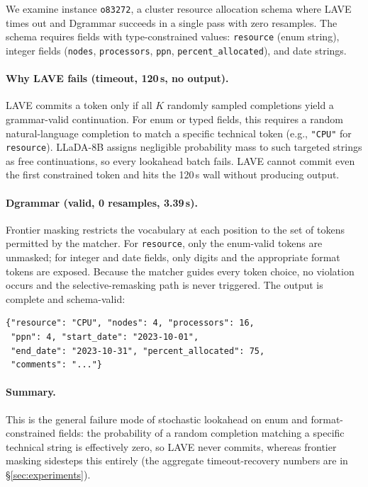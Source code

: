\documentclass[11pt]{article}
\begin{document}
We examine instance \texttt{o83272}, a cluster resource allocation schema where LAVE times out and Dgrammar succeeds in a single pass with zero resamples. The schema requires fields with type-constrained values: \texttt{resource} (enum string), integer fields (\texttt{nodes}, \texttt{processors}, \texttt{ppn}, \texttt{percent\_allocated}), and date strings.

\paragraph{Why LAVE fails (timeout, 120\,s, no output).} LAVE commits a token only if all $K$ randomly sampled completions yield a grammar-valid continuation. For enum or typed fields, this requires a random natural-language completion to match a specific technical token (e.g., \texttt{"CPU"} for \texttt{resource}). LLaDA-8B assigns negligible probability mass to such targeted strings as free continuations, so every lookahead batch fails. LAVE cannot commit even the first constrained token and hits the 120\,s wall without producing output.

\paragraph{Dgrammar (valid, 0 resamples, 3.39\,s).} Frontier masking restricts the vocabulary at each position to the set of tokens permitted by the matcher. For \texttt{resource}, only the enum-valid tokens are unmasked; for integer and date fields, only digits and the appropriate format tokens are exposed. Because the matcher guides every token choice, no violation occurs and the selective-remasking path is never triggered. The output is complete and schema-valid:

{\scriptsize\begin{verbatim}
{"resource": "CPU", "nodes": 4, "processors": 16,
 "ppn": 4, "start_date": "2023-10-01",
 "end_date": "2023-10-31", "percent_allocated": 75,
 "comments": "..."}
\end{verbatim}}

\paragraph{Summary.} This is the general failure mode of stochastic lookahead on enum and format-constrained fields: the probability of a random completion matching a specific technical string is effectively zero, so LAVE never commits, whereas frontier masking sidesteps this entirely (the aggregate timeout-recovery numbers are in \S\ref{sec:experiments}).
\end{document}
